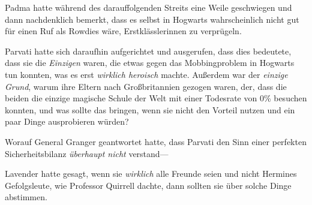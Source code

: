 Padma hatte während des darauffolgenden Streits eine Weile geschwiegen und dann nachdenklich bemerkt, dass es selbst in Hogwarts wahrscheinlich nicht gut für einen Ruf als Rowdies wäre, Erstklässlerinnen zu verprügeln.

Parvati hatte sich daraufhin aufgerichtet und ausgerufen, dass dies bedeutete, dass sie die \emph{Einzigen} waren, die etwas gegen das Mobbingproblem in Hogwarts tun konnten, was es erst \emph{wirklich heroisch} machte. Außerdem war der \emph{einzige} \emph{Grund}, warum ihre Eltern nach Großbritannien gezogen waren, der, dass die beiden die einzige magische Schule der Welt mit einer Todesrate von 0\% besuchen konnten, und was sollte das bringen, wenn sie nicht den Vorteil nutzen und ein paar Dinge ausprobieren würden?

Worauf General Granger geantwortet hatte, dass Parvati den Sinn einer perfekten Sicherheitsbilanz \emph{überhaupt nicht} verstand—

Lavender hatte gesagt, wenn sie \emph{wirklich} alle Freunde seien und nicht Hermines Gefolgsleute, wie Professor Quirrell dachte, dann sollten sie über solche Dinge abstimmen.

